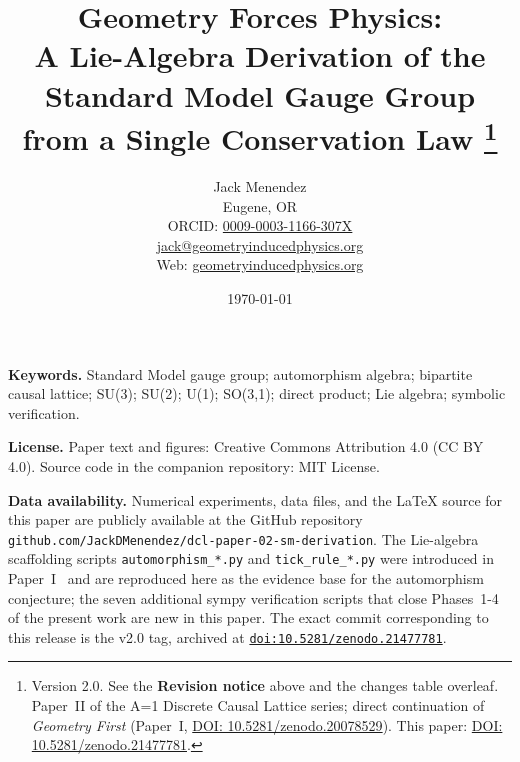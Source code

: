 \documentclass[12pt, letterpaper]{article}
\title{Geometry Forces Physics:\\
       A Lie-Algebra Derivation of the Standard Model Gauge Group\\
       from a Single Conservation Law%
       \thanks{Version 2.0.  See the \textbf{Revision notice} above and
       the changes table overleaf.
       Paper~II of the A=1 Discrete Causal
       Lattice series; direct continuation of
       \emph{Geometry First} (Paper~I,
       \href{https://doi.org/10.5281/zenodo.20078529}{DOI:
       10.5281/zenodo.20078529}).  This paper:
       \href{https://doi.org/10.5281/zenodo.21477781}{DOI:
       10.5281/zenodo.21477781}.
       }}
\author{Jack Menendez\\
        \small Eugene, OR\\
        \small ORCID: \href{https://orcid.org/0009-0003-1166-307X}{0009-0003-1166-307X}\\
        \small \href{mailto:jack@geometryinducedphysics.org}{jack@geometryinducedphysics.org}\\
        \small Web: \href{https://geometryinducedphysics.org/}{geometryinducedphysics.org}}
\date{\today}
\begin{document}
\maketitle



\begin{abstract}
    
\end{abstract}


\medskip
\noindent\textbf{Keywords.}  Standard Model gauge group; automorphism
algebra; bipartite causal lattice; SU(3); SU(2); U(1); SO(3,1);
direct product; Lie algebra; symbolic verification.

\medskip
\noindent\textbf{License.}  Paper text and figures: Creative Commons
Attribution 4.0 (CC BY 4.0).  Source code in the companion
repository: MIT License.

\medskip
\noindent\textbf{Data availability.}  Numerical experiments, data
files, and the LaTeX source for this paper are publicly available
at the GitHub repository
\nolinkurl{github.com/JackDMenendez/dcl-paper-02-sm-derivation}.
The Lie-algebra scaffolding scripts
\nolinkurl{automorphism_*.py} and \nolinkurl{tick_rule_*.py} were
introduced in Paper~I~\cite{menendez2026geometry} and are
reproduced here as the evidence base for the automorphism
conjecture; the seven additional sympy verification scripts that
close Phases~1-4 of the present work are new in this paper.
The exact commit corresponding to this release is the v2.0 tag,
archived at
\href{https://doi.org/10.5281/zenodo.21477781}%
     {\nolinkurl{doi:10.5281/zenodo.21477781}}.

\end{document}
